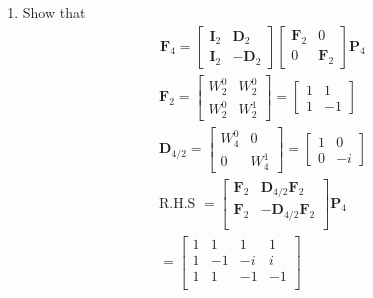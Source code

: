 \documentclass[journal,12pt,twocolumn]{IEEEtran}
\let\vec\mathbf
\renewcommand\thesection{\arabic{section}}
\begin{document}
\begin{enumerate}[label=\arabic*.,ref=\thesection.\theenumi]
\item Show that 
\begin{align}
	\vec{F}_{4}=
	\begin{bmatrix}
		\vec{I}_{2} & \vec{D}_{2} \\
		\vec{I}_{2} & -\vec{D}_{2}
	\end{bmatrix}
	\begin{bmatrix}
		\vec{F}_{2} & 0 \\
		0 & \vec{F}_{2}
	\end{bmatrix}
	\vec{P}_{4}
\end{align}
\solution
\begin{align}
	\vec{F}_{2} = 
	\begin{bmatrix}
		W_{2}^0	&	W_{2}^0\\
		W_{2}^0	&	W_{2}^1
	\end{bmatrix}
	=		\begin{bmatrix}
		1	&	1\\
		1	&	-1
	\end{bmatrix}\\
	\vec{D}_{4/2} =
	\begin{bmatrix}
		W_4^0 &	0\\
		0	&	W_4^1 
	\end{bmatrix}
	=\begin{bmatrix}
		1	&	0\\
		0	&	-i 
	\end{bmatrix}\\
	\text{R.H.S } = 
	\begin{bmatrix}
		\vec{F}_{2} & \vec{D}_{4/2} \vec{F}_{2}\\
		\vec{F}_{2} & -\vec{D}_{4/2} \vec{F}_{2}\\
	\end{bmatrix}\vec{P}_{4}\\
	=\begin{bmatrix}
		1	&	1	&	1	&	1\\
		1	&	-1	&	-i	&	i\\
		1	&	1	&	-1	&	-1\\

\end{bmatrix}
\end{align}
\end{enumerate}
\end{document}

